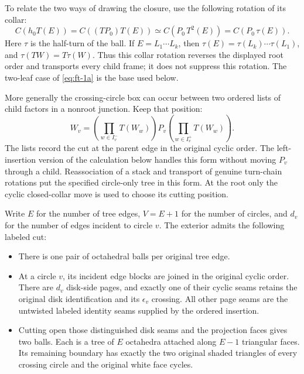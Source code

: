 To relate the two ways of drawing the closure, use the following
rotation of its collar:
\begin{equation}
C\!\left(h_0T(E)\right)
 =C\!\left((TP_0)T(E)\right)
 \simeq C\!\left(P_0\,T^2(E)\right)
 =C\!\left(P_0\,\tau(E)\right).
\label{eq:ft-1a}
\end{equation}
Here \(\tau\) is the half-turn of the ball. If \(E=L_1\cdots L_k\), then \(\tau(E)=\tau(L_k)\cdots\tau(L_1)\), and \(\tau(TW)=T\tau(W)\). Thus this collar rotation reverses the displayed root order and transports every child frame; it does not suppress this rotation. The two-leaf case of \eqref{eq:ft-1a} is the base used below.

More generally the crossing-circle box can occur between two ordered lists of child factors in a nonroot junction. Keep that position:
\begin{equation}
W_v=\left(\prod_{w\in I_v^-}T(W_w)\right)P_v
          \left(\prod_{w\in I_v^+}T(W_w)\right).
\label{eq:ft-1b}
\end{equation}
The lists record the cut at the parent edge in the original cyclic order. The left-insertion version of the calculation below handles this form without moving \(P_v\) through a child. Reassociation of a stack and transport of genuine turn-chain rotations put the specified circle-only tree in this form. At the root only the cyclic closed-collar move is used to choose its cutting position.

Write \(E\) for the number of tree edges, \(V=E+1\) for the number of circles, and \(d_v\) for the number of edges incident to circle \(v\). The exterior admits the following labeled cut:

\begin{itemize}
\item
  There is one pair of octahedral balls per original tree edge.
\item
  At a circle \(v\), its incident edge blocks are joined in the original cyclic order. There are \(d_v\) disk-side pages, and exactly one of their cyclic seams retains the original disk identification and its \(\epsilon_v\) crossing. All other page seams are the untwisted labeled identity seams supplied by the ordered insertion.
\item
  Cutting open those distinguished disk seams and the projection faces gives two balls. Each is a tree of \(E\) octahedra attached along \(E-1\) triangular faces. Its remaining boundary has exactly the two original shaded triangles of every crossing circle and the original white face cycles.
\end{itemize}

